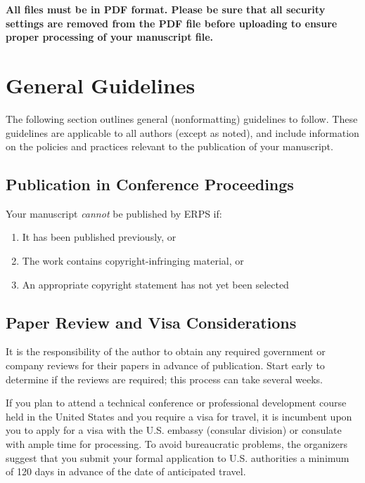 \documentclass[conf]{new-aiaa}
\begin{document}
    \textbf{All files must be in PDF format. Please be sure that all security settings are removed from the PDF file before uploading to ensure proper processing of your manuscript file. }
    
    \section{General Guidelines}
    
    The following section outlines general (nonformatting) guidelines to follow. These guidelines are applicable to all authors (except as noted), and include information on the policies and practices relevant to the publication of your manuscript.
    
    \subsection{Publication in Conference Proceedings}
    
    Your manuscript \textit{cannot} be published by ERPS if:
    \begin{enumerate}
        \item It has been published previously, or
        \item The work contains copyright-infringing material, or
        \item An appropriate copyright statement has not yet been selected
    \end{enumerate}
    
    \subsection{Paper Review and Visa Considerations}
    
    It is the responsibility of the author to obtain any required government or company reviews for their papers in advance of publication. Start early to determine if the reviews are required; this process can take several weeks.

    If you plan to attend a technical conference or professional development course held in the United States and you require a visa for travel, it is incumbent upon you to apply for a visa with the U.S. embassy (consular division) or consulate with ample time for processing.  To avoid bureaucratic problems, the organizers suggest that you submit your formal application to U.S. authorities a minimum of 120 days in advance of the date of anticipated travel.
    
\end{document}
